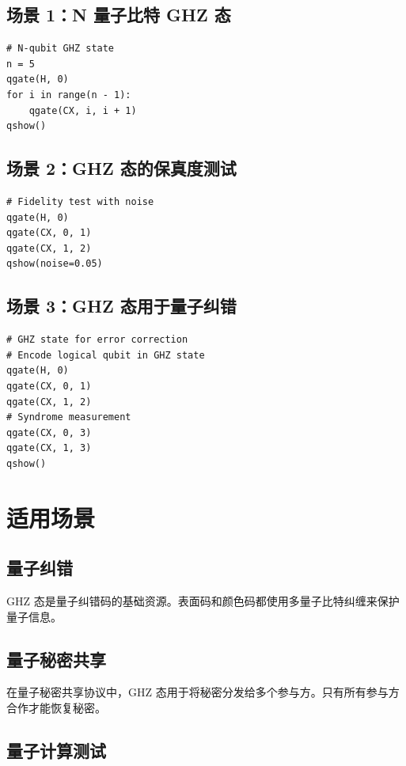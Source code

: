 \documentclass[12pt,a4paper]{article}
\begin{document}
\subsection{场景 1：N 量子比特 GHZ 态}

\begin{lstlisting}[style=python]
# N-qubit GHZ state
n = 5
qgate(H, 0)
for i in range(n - 1):
    qgate(CX, i, i + 1)
qshow()
\end{lstlisting}

\subsection{场景 2：GHZ 态的保真度测试}

\begin{lstlisting}[style=python]
# Fidelity test with noise
qgate(H, 0)
qgate(CX, 0, 1)
qgate(CX, 1, 2)
qshow(noise=0.05)
\end{lstlisting}

\subsection{场景 3：GHZ 态用于量子纠错}

\begin{lstlisting}[style=python]
# GHZ state for error correction
# Encode logical qubit in GHZ state
qgate(H, 0)
qgate(CX, 0, 1)
qgate(CX, 1, 2)
# Syndrome measurement
qgate(CX, 0, 3)
qgate(CX, 1, 3)
qshow()
\end{lstlisting}

\section{适用场景}

\subsection{量子纠错}

GHZ 态是量子纠错码的基础资源。表面码和颜色码都使用多量子比特纠缠来保护量子信息。

\subsection{量子秘密共享}

在量子秘密共享协议中，GHZ 态用于将秘密分发给多个参与方。只有所有参与方合作才能恢复秘密。

\subsection{量子计算测试}
\end{document}
